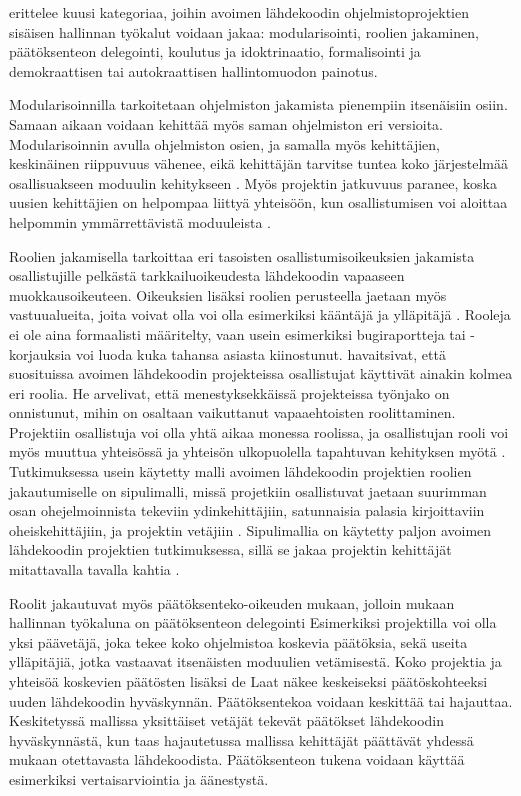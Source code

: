 \documentclass[utf8]{gradu3}
\begin{document}
\textcite{Laat-2007} erittelee kuusi kategoriaa, joihin avoimen lähdekoodin
ohjelmistoprojektien sisäisen hallinnan työkalut voidaan jakaa: modularisointi,
roolien jakaminen, päätöksenteon delegointi, koulutus ja idoktrinaatio,
formalisointi ja demokraattisen tai autokraattisen hallintomuodon painotus.

Modularisoinnilla tarkoitetaan ohjelmiston jakamista pienempiin itsenäisiin
osiin. Samaan aikaan voidaan kehittää myös saman ohjelmiston eri versioita.
Modularisoinnin avulla ohjelmiston osien, ja samalla myös kehittäjien,
keskinäinen riippuvuus vähenee, eikä kehittäjän tarvitse tuntea koko
järjestelmää osallisuakseen moduulin kehitykseen \parencite{Lee-2001}. Myös
projektin jatkuvuus paranee, koska uusien kehittäjien on helpompaa liittyä
yhteisöön, kun osallistumisen voi aloittaa helpommin ymmärrettävistä moduuleista
\parencite{Aberdour-2007,Lee-2001}.

Roolien jakamisella \textcite{Laat-2007} tarkoittaa eri tasoisten
osallistumisoikeuksien jakamista osallistujille pelkästä tarkkailuoikeudesta
lähdekoodin vapaaseen muokkausoikeuteen. Oikeuksien lisäksi roolien perusteella
jaetaan myös vastuualueita, joita voivat olla voi olla esimerkiksi kääntäjä ja
ylläpitäjä \parencite{Laat-2007}. Rooleja ei ole aina formaalisti määritelty,
vaan usein esimerkiksi bugiraportteja tai -korjauksia voi luoda kuka tahansa
asiasta kiinostunut. \textcite{Yuan-2010} havaitsivat, että suosituissa avoimen
lähdekoodin projekteissa osallistujat käyttivät ainakin kolmea eri roolia. He
arvelivat, että menestyksekkäissä projekteissa työnjako on onnistunut, mihin on
osaltaan vaikuttanut vapaaehtoisten roolittaminen. Projektiin osallistuja voi
olla yhtä aikaa monessa roolissa, ja osallistujan rooli voi myös muuttua
yhteisössä ja yhteisön ulkopuolella tapahtuvan kehityksen myötä
\parencite{Trinkenreich-2020}. Tutkimuksessa usein käytetty malli avoimen
lähdekoodin projektien roolien jakautumiselle on sipulimalli, missä projetkiin
osallistuvat jaetaan  suurimman osan ohejelmoinnista tekeviin ydinkehittäjiin,
satunnaisia palasia kirjoittaviin oheiskehittäjiin, ja projektin vetäjiin
\parencite{Crowston-2005, Mockus-2002}. Sipulimallia on käytetty paljon avoimen
lähdekoodin projektien tutkimuksessa, sillä se jakaa projektin kehittäjät
mitattavalla tavalla kahtia \parencite[esim.][]{Setia-2012,Alfayez-2017}.

Roolit jakautuvat myös päätöksenteko-oikeuden mukaan, jolloin
\textcite{Laat-2007} mukaan hallinnan työkaluna on päätöksenteon delegointi
Esimerkiksi projektilla voi olla yksi päävetäjä, joka tekee koko ohjelmistoa
koskevia päätöksia, sekä useita ylläpitäjiä, jotka vastaavat itsenäisten
moduulien vetämisestä. Koko projektia ja yhteisöä koskevien päätösten lisäksi de
Laat näkee keskeiseksi päätöskohteeksi uuden lähdekoodin hyväskynnän.
Päätöksentekoa voidaan keskittää tai hajauttaa. Keskitetyssä mallissa
yksittäiset vetäjät tekevät päätökset lähdekoodin hyväskynnästä, kun taas
hajautetussa mallissa kehittäjät päättävät yhdessä mukaan otettavasta
lähdekoodista. Päätöksenteon tukena voidaan käyttää esimerkiksi
vertaisarviointia ja äänestystä. 
\end{document}

